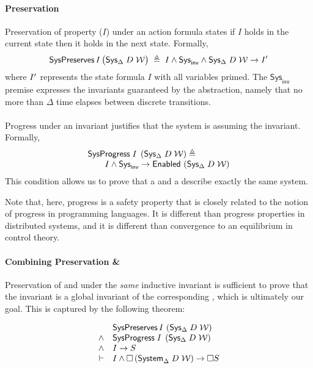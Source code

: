 \paragraph{Preservation}
Preservation of property ($I$) under an action formula states if $I$ holds
in the current state then it holds in the next state. Formally,
\[
\mathsf{SysPreserves}\,I\,\big({\textsf{Sys}}{}_{\Delta}\;D\;\mathcal{W}\big) \;\triangleq\; I \wedge \mathsf{Sys}_{\mathsf{inv}} \wedge {\textsf{Sys}}{}_{\Delta}\;D\;\mathcal{W} \rightarrow I{}^\prime
\]
where $I{}^\prime$ represents the state formula $I$ with all variables
primed.  The $\mathsf{Sys}_{\mathsf{inv}}$ premise expresses the invariants
guaranteed by the \SysA{} abstraction, namely that no more than $\Delta$
time elapses between discrete transitions.

\paragraph{\Progress{}}
Progress under an invariant justifies that the system is \Enabled assuming
the invariant. Formally,
\[\begin{array}{l}
\mathsf{SysProgress{}}\;I\;\left({\textsf{Sys}}{}_{\Delta}\;D\;\mathcal{W}\right) \triangleq \\
\qquad I \wedge \mathsf{Sys}_{\mathsf{inv}} \rightarrow \textsf{Enabled}\, \left({\textsf{Sys}}{}_{\Delta}\;D\;\mathcal{W}\right)
\end{array}
\]
This condition allows us to prove that a \SysA{} and a \System{} describe
exactly the same system.

Note that, here, progress is a safety property that is closely related to
the notion of progress in programming languages.  It is different than
progress properties in distributed systems, and it is different than
convergence to an equilibrium in control theory.

\paragraph{Combining Preservation \& \Progress{}}
Preservation of and \progress{} under the \emph{same} inductive invariant
is sufficient to prove that the invariant is a global invariant of the
corresponding \System, which is ultimately our goal.  This is captured by
the following theorem:

\begin{theorem}{}
\[\begin{array}{rl}
 & \mathsf{SysPreserves}\,I\,\left({\textsf{Sys}}{}_{\Delta}\;D\;\mathcal{W}\right) \\
\wedge & \mathsf{SysProgress{}}\;I\;\left({\textsf{Sys}}{}_{\Delta}\;D\;\mathcal{W}\right) \\
\wedge & I \rightarrow S \\
\vdash & I \wedge \Box{} \left(\mathsf{System}_{\Delta}\;D\;\mathcal{W}\right) \rightarrow \Box{} S
\end{array}
\]
\end{theorem}

